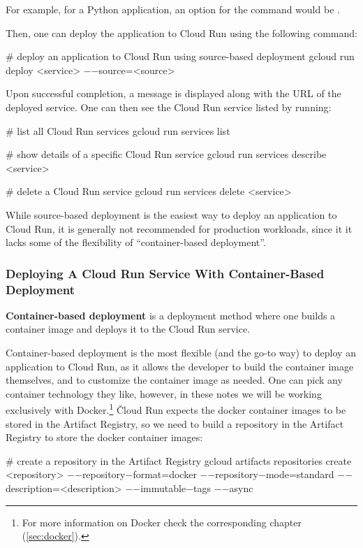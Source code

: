 \be
For example, for a Python application, an option for the command would be .
\ee

Then, one can deploy the application to Cloud Run using the following command:
\begin{bash}
# deploy an application to Cloud Run using source-based deployment
gcloud run deploy <service> $-$$-$source=<source>
\end{bash}

Upon successful completion, a message is displayed along with the URL of the deployed service. One can then see the
Cloud Run service listed by running:
\begin{bash}
# list all Cloud Run services
gcloud run services list
\end{bash}

\begin{bash}
# show details of a specific Cloud Run service
gcloud run services describe <service>
\end{bash}

\begin{bash}
# delete a Cloud Run service
gcloud run services delete <service>
\end{bash}

While source-based deployment is the easiest way to deploy an application to Cloud Run, it is generally not recommended
for production workloads, since it it lacks some of the flexibility of ``container-based deployment''.

\subsubsection{Deploying A Cloud Run Service With Container-Based Deployment}

\textbf{Container-based deployment} is a deployment method where one builds a container image and deploys it to the
Cloud Run service.
\ed

Container-based deployment is the most flexible (and the go-to way) to deploy an application to Cloud Run, as it allows
the developer to build the container image themselves, and to customize the container image as needed. One can pick any
container technology they like, however, in these notes we will be working exclusively with Docker.\footnote{For more
information on Docker check the corresponding chapter (\ref{sec:docker}).} \v

Cloud Run expects the docker container images to be stored in the Artifact Registry, so we need to build a repository
in the Artifact Registry to store the docker container images:
\begin{bash}
# create a repository in the Artifact Registry
gcloud artifacts repositories create <repository>
    $-$$-$repository$-$format=docker
    $-$$-$repository$-$mode=standard
    $-$$-$description=<description>
    $-$$-$immutable$-$tags
    $-$$-$async
\end{bash}

